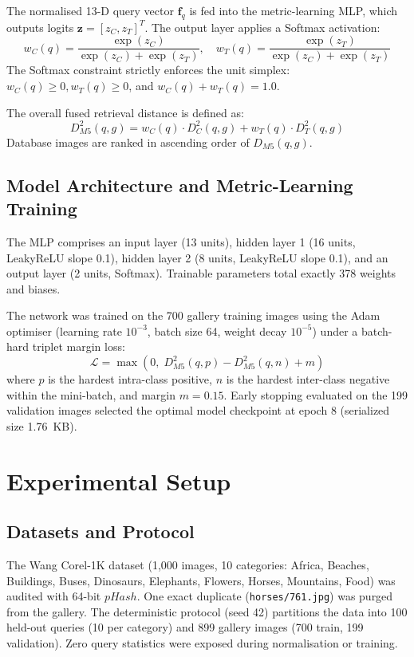 \documentclass[pdflatex,sn-mathphys-num]{sn-jnl}
\begin{document}
The normalised 13-D query vector $\mathbf{f}_q$ is fed into the metric-learning MLP, which outputs logits $\mathbf{z} = [z_C, z_T]^T$. The output layer applies a Softmax activation:
\begin{equation}
w_C(q) = \frac{\exp(z_C)}{\exp(z_C) + \exp(z_T)}, \quad w_T(q) = \frac{\exp(z_T)}{\exp(z_C) + \exp(z_T)}
\end{equation}
The Softmax constraint strictly enforces the unit simplex: $w_C(q) \ge 0, w_T(q) \ge 0$, and $w_C(q) + w_T(q) = 1.0$.

The overall fused retrieval distance is defined as:
\begin{equation}
D_{M5}^2(q, g) = w_C(q) \cdot D_C^2(q, g) + w_T(q) \cdot D_T^2(q, g)
\end{equation}
Database images are ranked in ascending order of $D_{M5}(q, g)$.

\subsection{Model Architecture and Metric-Learning Training}
The MLP comprises an input layer (13 units), hidden layer 1 (16 units, LeakyReLU slope 0.1), hidden layer 2 (8 units, LeakyReLU slope 0.1), and an output layer (2 units, Softmax). Trainable parameters total exactly 378 weights and biases.

The network was trained on the 700 gallery training images using the Adam optimiser (learning rate $10^{-3}$, batch size 64, weight decay $10^{-5}$) under a batch-hard triplet margin loss:
\begin{equation}
\mathcal{L} = \max\left(0, \; D_{M5}^2(q, p) - D_{M5}^2(q, n) + m\right)
\end{equation}
where $p$ is the hardest intra-class positive, $n$ is the hardest inter-class negative within the mini-batch, and margin $m = 0.15$. Early stopping evaluated on the 199 validation images selected the optimal model checkpoint at epoch 8 (serialized size 1.76~KB).

\section{Experimental Setup}\label{sec4}
\subsection{Datasets and Protocol}
The Wang Corel-1K dataset (1,000 images, 10 categories: Africa, Beaches, Buildings, Buses, Dinosaurs, Elephants, Flowers, Horses, Mountains, Food) was audited with 64-bit $pHash$. One exact duplicate (\texttt{horses/761.jpg}) was purged from the gallery. The deterministic protocol (seed 42) partitions the data into 100 held-out queries (10 per category) and 899 gallery images (700 train, 199 validation). Zero query statistics were exposed during normalisation or training.
\end{document}
